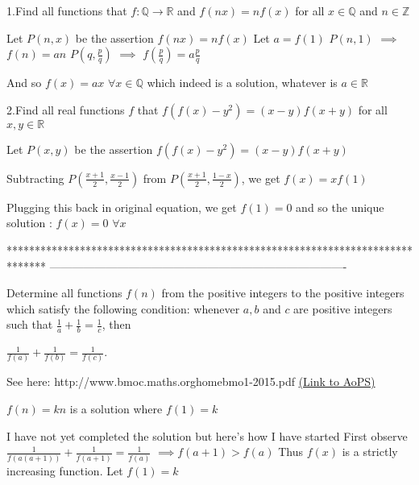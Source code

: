 \begin{solution}
	\begin{tcolorbox}1.Find all functions that $f:\mathbb{Q}\rightarrow\mathbb{R}$ and
$f(nx)=nf(x)$ for all $x\in\mathbb{Q}$	and $n\in\mathbb{Z}$
\end{tcolorbox}
Let $P(n,x)$ be the assertion $f(nx)=nf(x)$
Let $a=f(1)$
$P(n,1)$ $\implies$ $f(n)=an$
$P(q,\frac pq)$ $\implies$ $f(\frac pq)=a\frac pq$

And so $\boxed{f(x)=ax}$ $\forall x\in\mathbb Q$ which indeed is a solution, whatever is $a\in\mathbb R$
\end{solution}



\begin{solution}
	\begin{tcolorbox}2.Find all real functions $f$ that
$f(f(x)-y^2)=(x-y)f(x+y)$ for all $x,y\in\mathbb{R}$\end{tcolorbox}
Let $P(x,y)$ be the assertion $f(f(x)-y^2)=(x-y)f(x+y)$

Subtracting $P(\frac{x+1}2,\frac{x-1}2)$ from $P(\frac{x+1}2,\frac{1-x}2)$, we get $f(x)=xf(1)$

Plugging this back in original equation, we get $f(1)=0$ and so the unique solution : $\boxed{f(x)=0}$ $\forall x$
\end{solution}
*******************************************************************************
-------------------------------------------------------------------------------

\begin{problem}
	Determine all functions $f(n)$ from the positive integers to the positive integers which satisfy the following condition: whenever $a, b$ and $c$ are positive integers such that $\frac{1}{a} + \frac{1}{b} = \frac{1}{c}$, then

$\frac{1}{f(a)} + \frac{1}{f(b)} = \frac{1}{f(c)}$.

See here: http://www.bmoc.maths.org\/home\/bmo1-2015.pdf
	\flushright \href{https://artofproblemsolving.com/community/c6h615751}{(Link to AoPS)}
\end{problem}



\begin{solution}
	$f(n)=kn$ is a solution where $f(1)=k$

I have not yet completed the solution but here's how I have started
First observe
$\frac{1}{f(a(a+1))}+\frac{1}{f(a+1)}=\frac{1}{f(a)}$
$\implies f(a+1) > f(a)$
Thus $f(x)$ is a strictly increasing function.
Let $f(1)=k$
\end{solution}



